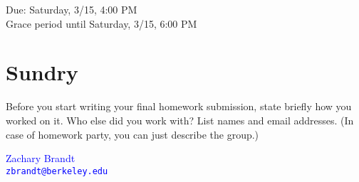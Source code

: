 \documentclass[11pt]{article}
\begin{document}
\maketitle
\fontsize{12}{15}\selectfont

\begin{center}
    Due: Saturday, 3/15, 4:00 PM \\
    Grace period until Saturday, 3/15, 6:00 PM \\
\end{center}

\section*{Sundry}
Before you start writing your final homework submission, state briefly how you 
worked on it.  Who else did you work with?  List names and email addresses. 
(In case of homework party, you can just describe the group.)

\begin{center}
    \textcolor{blue}{
        Zachary Brandt \\
        \nolinkurl{zbrandt@berkeley.edu}
    }
\end{center}

\vspace{15pt}
\end{document}
